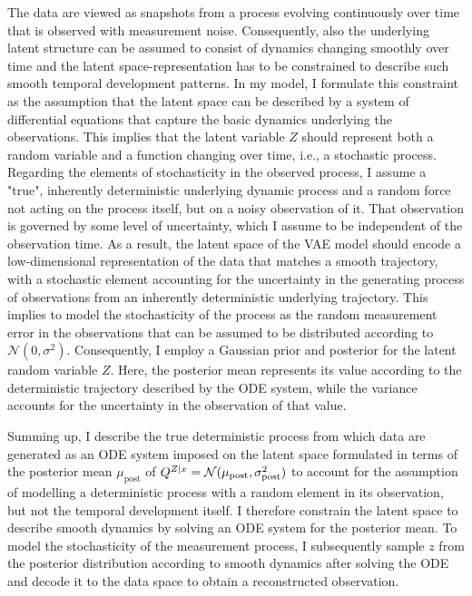 The data are viewed as snapshots from a process evolving continuously over time that is observed with measurement noise. Consequently, also the underlying latent structure can be assumed to consist of dynamics changing smoothly over time and the latent space-representation has to be constrained to describe such smooth temporal development patterns. In my model, I formulate this constraint as the assumption that the latent space can be described by a system of differential equations that capture the basic dynamics underlying the observations.
This implies that the latent variable $Z$ should represent both a random variable and a function changing over time, i.e., a stochastic process.
Regarding the elements of stochasticity in the observed process, I assume a "true", inherently deterministic underlying dynamic process and a random force not acting on the process itself, but on a noisy observation of it. That observation is governed by some level of uncertainty, which I assume to be independent of the observation time. 
As a result, the latent space of the VAE model should encode a low-dimensional representation of the data that matches a smooth trajectory, with a stochastic element accounting for the uncertainty in the generating process of observations from an inherently deterministic underlying trajectory. 
This implies to model the stochasticity of the process as the random measurement error in the observations that can be assumed to be distributed according to $\mathcal{N}(0,\sigma^2)$. 
Consequently, I employ a Gaussian prior and posterior for the latent random variable $Z$. Here, the posterior mean represents its value according to the deterministic trajectory described by the ODE system, while the variance accounts for the uncertainty in the observation of that value. 

Summing up, I describe the true deterministic process from which data are generated as an ODE system imposed on the latent space formulated in terms of the posterior mean $\mu_{\mathrm{post}}$ of $Q^{Z\mid x} = \mathcal{N}(\mu_{\mathrm{post}}, \sigma_{\mathrm{post}}^2)$ to account for the assumption of modelling a deterministic process with a random element in its observation, but not the temporal development itself. I therefore constrain the latent space to describe smooth dynamics by solving an ODE system for the posterior mean. To model the stochasticity of the measurement process, I subsequently sample $z$ from the posterior distribution according to smooth dynamics after solving the ODE and decode it to the data space to obtain a reconstructed observation.


